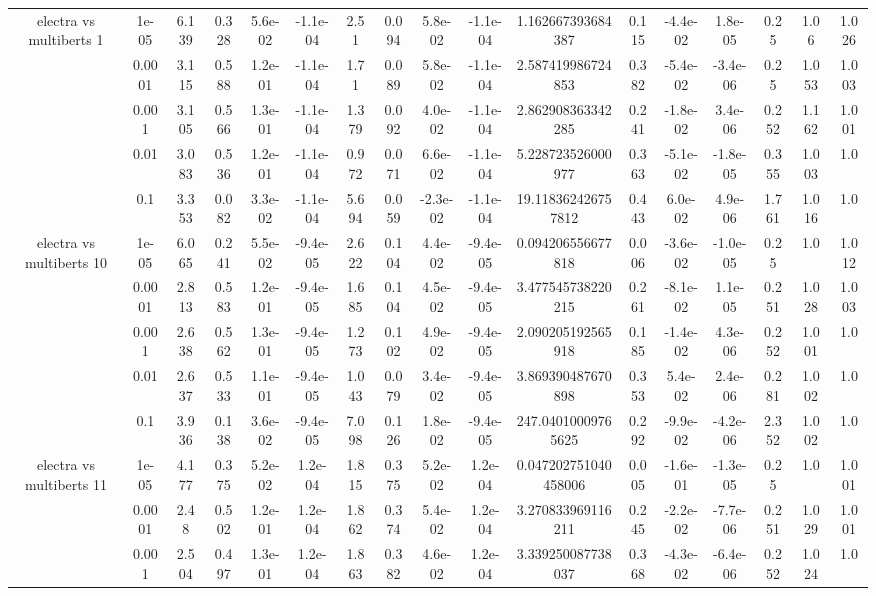 \begin{tabular}{|c|c|c|c|c|c|c|c|c|c|c|c|c|c|c|c|c|}
\hline
\multirow{5}{*}{electra  vs multiberts 1} & 1e-05 & 6.139 & 0.328 & 5.6e-02 & -1.1e-04 & 2.51 & 0.094 & 5.8e-02 & -1.1e-04 & 1.162667393684387 & 0.115 & -4.4e-02 & 1.8e-05 & 0.25 & 1.06 & 1.026 \\
 & 0.0001 & 3.115 & 0.588 & 1.2e-01 & -1.1e-04 & 1.71 & 0.089 & 5.8e-02 & -1.1e-04 & 2.587419986724853 & 0.382 & -5.4e-02 & -3.4e-06 & 0.25 & 1.053 & 1.003 \\
 & 0.001 & 3.105 & 0.566 & 1.3e-01 & -1.1e-04 & 1.379 & 0.092 & 4.0e-02 & -1.1e-04 & 2.862908363342285 & 0.241 & -1.8e-02 & 3.4e-06 & 0.252 & 1.162 & 1.001 \\
 & 0.01 & 3.083 & 0.536 & 1.2e-01 & -1.1e-04 & 0.972 & 0.071 & 6.6e-02 & -1.1e-04 & 5.228723526000977 & 0.363 & -5.1e-02 & -1.8e-05 & 0.355 & 1.003 & 1.0 \\
 & 0.1 & 3.353 & 0.082 & 3.3e-02 & -1.1e-04 & 5.694 & 0.059 & -2.3e-02 & -1.1e-04 & 19.118362426757812 & 0.443 & 6.0e-02 & 4.9e-06 & 1.761 & 1.016 & 1.0 \\
\hline
\multirow{5}{*}{electra  vs multiberts 10} & 1e-05 & 6.065 & 0.241 & 5.5e-02 & -9.4e-05 & 2.622 & 0.104 & 4.4e-02 & -9.4e-05 & 0.094206556677818 & 0.006 & -3.6e-02 & -1.0e-05 & 0.25 & 1.0 & 1.012 \\
 & 0.0001 & 2.813 & 0.583 & 1.2e-01 & -9.4e-05 & 1.685 & 0.104 & 4.5e-02 & -9.4e-05 & 3.477545738220215 & 0.261 & -8.1e-02 & 1.1e-05 & 0.251 & 1.028 & 1.003 \\
 & 0.001 & 2.638 & 0.562 & 1.3e-01 & -9.4e-05 & 1.273 & 0.102 & 4.9e-02 & -9.4e-05 & 2.090205192565918 & 0.185 & -1.4e-02 & 4.3e-06 & 0.252 & 1.001 & 1.0 \\
 & 0.01 & 2.637 & 0.533 & 1.1e-01 & -9.4e-05 & 1.043 & 0.079 & 3.4e-02 & -9.4e-05 & 3.869390487670898 & 0.353 & 5.4e-02 & 2.4e-06 & 0.281 & 1.002 & 1.0 \\
 & 0.1 & 3.936 & 0.138 & 3.6e-02 & -9.4e-05 & 7.098 & 0.126 & 1.8e-02 & -9.4e-05 & 247.04010009765625 & 0.292 & -9.9e-02 & -4.2e-06 & 2.352 & 1.002 & 1.0 \\
\hline
\multirow{5}{*}{electra  vs multiberts 11} & 1e-05 & 4.177 & 0.375 & 5.2e-02 & 1.2e-04 & 1.815 & 0.375 & 5.2e-02 & 1.2e-04 & 0.047202751040458006 & 0.005 & -1.6e-01 & -1.3e-05 & 0.25 & 1.0 & 1.001 \\
 & 0.0001 & 2.48 & 0.502 & 1.2e-01 & 1.2e-04 & 1.862 & 0.374 & 5.4e-02 & 1.2e-04 & 3.270833969116211 & 0.245 & -2.2e-02 & -7.7e-06 & 0.251 & 1.029 & 1.001 \\
 & 0.001 & 2.504 & 0.497 & 1.3e-01 & 1.2e-04 & 1.863 & 0.382 & 4.6e-02 & 1.2e-04 & 3.339250087738037 & 0.368 & -4.3e-02 & -6.4e-06 & 0.252 & 1.024 & 1.0 \\

\end{tabular}
